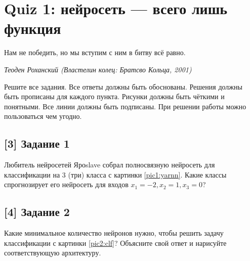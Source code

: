 \documentclass[12pt, a4paper, oneside]{article}
\begin{document}
\section*{Quiz 1: нейросеть --- всего лишь функция}

\epigraph{Нам не победить, но мы вступим с ним в битву всё равно.}{\textit{Теоден Роханский (Властелин колец: Братсво Кольца, 2001)}}

Решите все задания. Все ответы должны быть обоснованы. Решения должны быть прописаны для каждого пункта. Рисунки должны быть чёткими и понятными. Все линии должны быть подписаны. При решении работы можно пользоваться чем угодно.

\vspace{-0.5cm}
\subsection*{[3] Задание 1} 
\vspace{-0.5cm}

Любитель нейросетей Яроslave собрал полносвязную нейросеть для классификации на $3$ (три) класса с картинки \ref{pic1:yarnn}. Какие классы спрогнозирует его нейросеть для входов $x_1 = -2, x_2 = 1, x_3 = 0$? 

\vspace{-0.5cm}
\subsection*{[4] Задание 2}
\vspace{-0.5cm}

Какие минимальное количество нейронов нужно, чтобы решить задачу классификации с картинки \ref{pic2:clf}? Объясните свой ответ и нарисуйте соответствующую архитектуру. 

\end{document}
